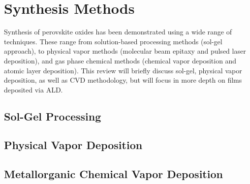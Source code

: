 \chapter{Synthesis Methods}
\label{chap:synthesis}
\thispagestyle{empty}


Synthesis of perovskite oxides has been demonstrated using a wide range of techniques. These range from solution-based processing methods (sol-gel approach), to physical vapor methods (molecular beam epitaxy and pulsed laser deposition), and gas phase chemical methods (chemical vapor deposition and atomic layer deposition). This review will briefly discuss sol-gel, physical vapor deposition, as well as CVD methodology, but will focus in more depth on films deposited via ALD. 


\section{Sol-Gel Processing}

\lipsum


\section{Physical Vapor Deposition}

\lipsum


\section{Metallorganic Chemical Vapor Deposition}

\lipsum


